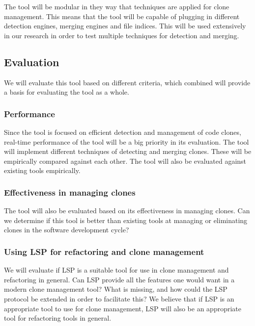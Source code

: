\documentclass[12pt]{article}
\begin{document}
The tool will be modular in they way that techniques are applied for clone management. This
means that the tool will be capable of plugging in different detection engines, merging
engines and file indices. This will be used extensively in our research in order to test
multiple techniques for detection and merging.

\subsection{Evaluation}

We will evaluate this tool based on different criteria, which combined will provide a
basis for evaluating the tool as a whole.

\subsubsection{Performance}

Since the tool is focused on efficient detection and management of code clones, real-time
performance of the tool will be a big priority in its evaluation. The tool will implement
different techniques of detecting and merging clones. These will be empirically compared
against each other. The tool will also be evaluated against existing tools empirically.

\subsubsection{Effectiveness in managing clones}

The tool will also be evaluated based on its effectiveness in managing clones. Can we
determine if this tool is better than existing tools at managing or eliminating clones in
the software development cycle?

\subsubsection{Using LSP for refactoring and clone management}

We will evaluate if LSP is a suitable tool for use in clone management and
refactoring in general. Can LSP provide all the features one would want in a modern clone
management tool? What is missing, and how could the LSP protocol be extended in order to
facilitate this? We believe that if LSP is an appropriate tool to use for clone
management, LSP will also be an appropriate tool for refactoring tools in general.

\newpage


\end{document}
